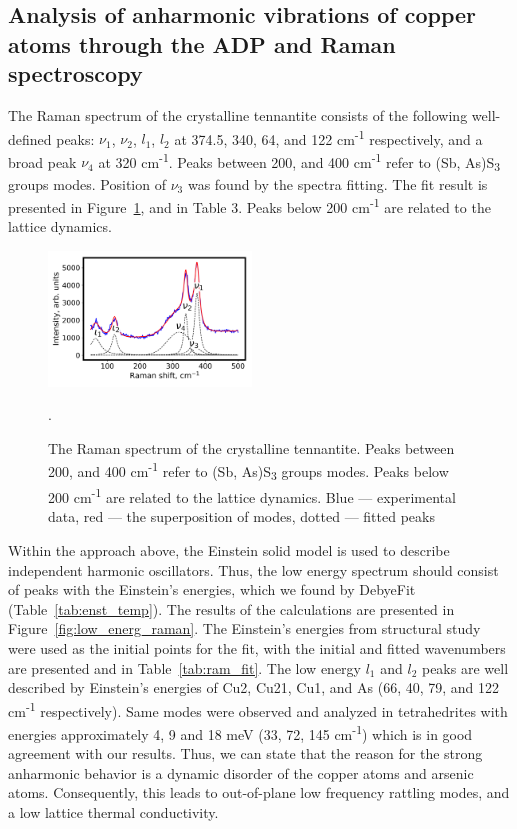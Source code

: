 \documentclass[preprint,review,12pt]{elsarticle}
\begin{document}
\subsection{Analysis of anharmonic vibrations of copper atoms through the ADP and Raman spectroscopy}\label{sec:level2}

The Raman spectrum of the crystalline tennantite consists of the following well-defined peaks: $\nu_{1}$, $\nu_{2}$, $l_{1}$, $l_{2}$ at 374.5, 340, 64, and 122 cm\textsuperscript{-1} respectively, and a broad peak $\nu_{4}$ at 320 cm\textsuperscript{-1}. Peaks between 200, and 400 cm\textsuperscript{-1} refer to (Sb, As)S\textsubscript{3} groups modes\cite{Kharbish2007}.
Position of $\nu_{3}$ was found by the spectra fitting.
The fit result is presented in Figure~\ref{fig:full_raman}, and in Table 3. Peaks below 200 cm\textsuperscript{-1} are related to the lattice dynamics\cite{Buzatu2017}.

\begin{figure}[h]
\centering
\includegraphics[width=0.48\textwidth]{raman_25_CuAsS3_eng_components}
\caption{\label{fig:full_raman} The Raman spectrum of the crystalline tennantite. Peaks between 200, and 400 cm\textsuperscript{-1} refer to (Sb, As)S\textsubscript{3} groups modes\cite{Kharbish2007}. Peaks below 200 cm\textsuperscript{-1} are related to the lattice dynamics\cite{Buzatu2017}. Blue --- experimental data, red --- the superposition of modes, dotted --- fitted peaks}.
\end{figure}

Within the approach above, the Einstein solid model is used to describe independent harmonic oscillators.
Thus, the low energy spectrum should consist of peaks with the Einstein's energies, which we found by DebyeFit (Table~\ref{tab:enst_temp}).
The results of the calculations are presented in Figure~\ref{fig:low_energ_raman}.
The Einstein's energies from structural study were used as the initial points for the fit, with the initial and fitted wavenumbers are presented and in Table~\ref{tab:ram_fit}.
The low energy $l_{1}$ and $l_{2}$ peaks are well described by Einstein's energies of Cu2, Cu21, Cu1, and As (66, 40, 79, and 122 cm\textsuperscript{-1} respectively).
Same modes were observed and analyzed in tetrahedrites\cite{May2016,Lai2015} with energies approximately 4, 9 and 18 meV (33, 72, 145 cm\textsuperscript{-1}) which is
in good agreement with our results.
Thus, we can state that the reason for the strong anharmonic behavior is a dynamic disorder of the copper atoms and arsenic atoms.
Consequently, this leads to out-of-plane low frequency rattling modes, and a low lattice thermal conductivity.
\end{document}
